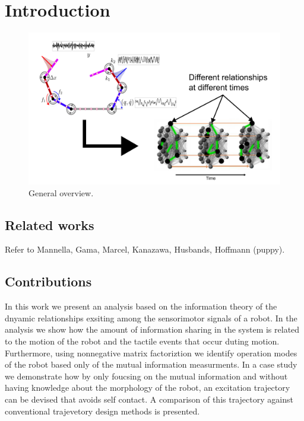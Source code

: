 \section{Introduction}\label{sec:intro}
\TODO
\begin{figure}[!th]
	\centering
	\includegraphics[width=0.9\columnwidth]{fig/general_overview.png}
	\caption{General overview.}
	\label{fig:general_overview}
\end{figure}


\subsection{Related works}

Refer to Mannella, Gama, Marcel, Kanazawa, Husbands, Hoffmann (puppy).

\subsection{Contributions}
\TODO
In this work we present an analysis based on the information theory of the dnyamic relationships exsiting among the sensorimotor signals of a robot. In the analysis we show how the amount of information sharing in the system is related to the motion of the robot and the tactile events that occur duting motion. Furthermore, using nonnegative matrix factoriztion we identify operation modes of the robot based only of the mutual information measurments. In a case study we demonstrate how by only foucsing on the mutual information and without having knowledge about the morphology of the robot, an excitation trajectory can be devised that avoids self contact. A comparison of this trajectory against conventional trajevetory design methods is presented.


